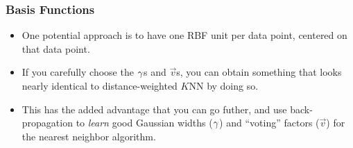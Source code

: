 \documentclass[trans]{beamer}
\begin{document}
\begin{frame}
  \frametitle{Basis Functions}
\begin{itemize}
\item One potential approach is
to have one RBF unit per data point, centered on that data point. 
\item If
you carefully choose the $\gamma$s and $\vec v$s, you can obtain
something that looks nearly identical to distance-weighted $K$NN by
doing so. 
\item This has the added advantage that you can go futher, and
use back-propagation to \emph{learn} good Gaussian widths ($\gamma$) and
``voting'' factors ($\vec v$) for the nearest neighbor algorithm.
\end{itemize}
\end{frame}
\end{document}
